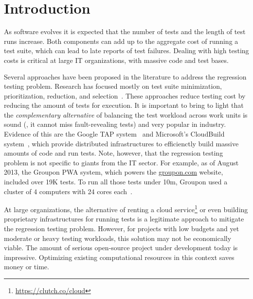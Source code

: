 \section{Introduction}


As software evolves it is expected that the number of tests and the
length of test runs increase.  Both components can add up to the
aggregate cost of running a test suite, which can lead to late reports
of test failures.  Dealing with high testing costs is critical at
large IT organizations, with massive code and test bases.

Several approaches have been proposed in the literature to address the
regression testing problem.  Research has focused mostly on test suite
minimization, prioritization, reduction, and
selection~\cite{yoo-harman-stvr2012}.  These approaches reduce testing
cost by reducing the amount of tests for execution.  It is important
to bring to light that the \emph{complementary alternative} of
balancing the test workload across work units is sound (\ie{}, it
cannot miss fault-revealing tests) and very popular in industry.
Evidence of this are the Google TAP system~\cite{google-tap,google-ci}
and Microsoft's CloudBuild
system~\cite{prasad-shulte-ieee-microsoft-ci}, which provide
distributed infrastructures to efficienctly build massive amounts of
code and run tests.  Note, however, that the regression testing
problem is not specific to giants from the IT sector.  For example, as
of August 2013, the Groupon PWA system, which powers the
\url{groupon.com} website, included over 19K tests.  To run all those
tests under 10m, Groupon used a cluster of 4 computers with 24 cores
each~\cite{kim-etal-fse2013}.




At large organizations, the alternative of renting a cloud
service\footnote{\url{https://clutch.co/cloud}} or even building
proprietary infrastructures for running tests is a legitimate approach
to mitigate the regression testing problem.  However, for projects
with low budgets and yet moderate or heavy testing workloads, this
solution may not be economically viable.  The amount of serious
open-source project under development today is impressive.  Optimizing existing computational
resources in this context saves money or time.  

